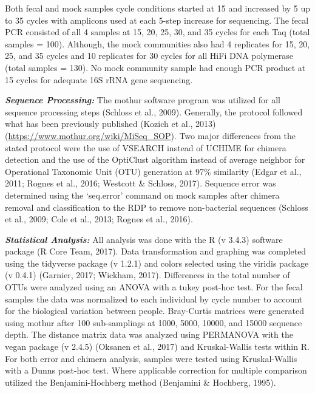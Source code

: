 \documentclass[12pt,]{article}
\begin{document}
Both fecal and mock samples cycle conditions started at 15 and increased
by 5 up to 35 cycles with amplicons used at each 5-step increase for
sequencing. The fecal PCR consisted of all 4 samples at 15, 20, 25, 30,
and 35 cycles for each Taq (total samples = 100). Although, the mock
communities also had 4 replicates for 15, 20, 25, and 35 cycles and 10
replicates for 30 cycles for all HiFi DNA polymerase (total samples =
130). No mock community sample had enough PCR product at 15 cycles for
adequate 16S rRNA gene sequencing.

\textbf{\emph{Sequence Processing:}} The mothur software program was
utilized for all sequence processing steps (Schloss et al., 2009).
Generally, the protocol followed what has been previously published
(Kozich et al., 2013) (\url{https://www.mothur.org/wiki/MiSeq_SOP}). Two
major differences from the stated protocol were the use of VSEARCH
instead of UCHIME for chimera detection and the use of the OptiClust
algorithm instead of average neighbor for Operational Taxonomic Unit
(OTU) generation at 97\% similarity (Edgar et al., 2011; Rognes et al.,
2016; Westcott \& Schloss, 2017). Sequence error was determined using
the `seq.error' command on mock samples after chimera removal and
classification to the RDP to remove non-bacterial sequences (Schloss et
al., 2009; Cole et al., 2013; Rognes et al., 2016).

\textbf{\emph{Statistical Analysis:}} All analysis was done with the R
(v 3.4.3) software package (R Core Team, 2017). Data transformation and
graphing was completed using the tidyverse package (v 1.2.1) and colors
selected using the viridis package (v 0.4.1) (Garnier, 2017; Wickham,
2017). Differences in the total number of OTUs were analyzed using an
ANOVA with a tukey post-hoc test. For the fecal samples the data was
normalized to each individual by cycle number to account for the
biological variation between people. Bray-Curtis matrices were generated
using mothur after 100 sub-samplings at 1000, 5000, 10000, and 15000
sequence depth. The distance matrix data was analyzed using PERMANOVA
with the vegan package (v 2.4.5) (Oksanen et al., 2017) and
Kruskal-Wallis tests within R. For both error and chimera analysis,
samples were tested using Kruskal-Wallis with a Dunns post-hoc test.
Where applicable correction for multiple comparison utilized the
Benjamini-Hochberg method (Benjamini \& Hochberg, 1995).
\end{document}
